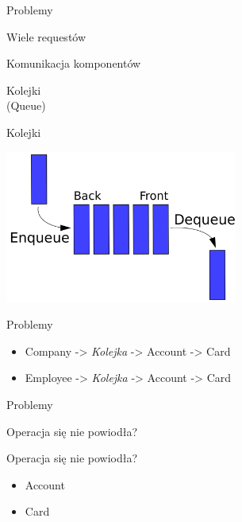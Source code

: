 \documentclass{beamer}
\begin{document}
\begin{frame}{Problemy}
	\begin{center}
		\Huge{Wiele requestów}
	\end{center}
\end{frame}

\begin{frame}{Komunikacja komponentów}
	\begin{center}
		\Huge{Kolejki}\\
		\huge{(Queue)}
	\end{center}
\end{frame}

\begin{frame}{Kolejki}
	\begin{center}
		\includegraphics[height=5cm]{queue1.png}
	\end{center}
\end{frame}

\begin{frame}{Problemy}
	\begin{huge}
		\begin{itemize}[<+->]
			\item Company -> \textit{Kolejka} -> Account -> Card
			\item Employee -> \textit{Kolejka} -> Account -> Card
		\end{itemize}
	\end{huge}
\end{frame}

\begin{frame}{Problemy}
	\begin{center}
		\Huge{Operacja się nie powiodła?}
	\end{center}
\end{frame}

\begin{frame}{Operacja się nie powiodła?}
	\begin{huge}
		\begin{itemize}
			\item Account
			\item Card
		\end{itemize}
	\end{huge}
\end{frame}
\end{document}
